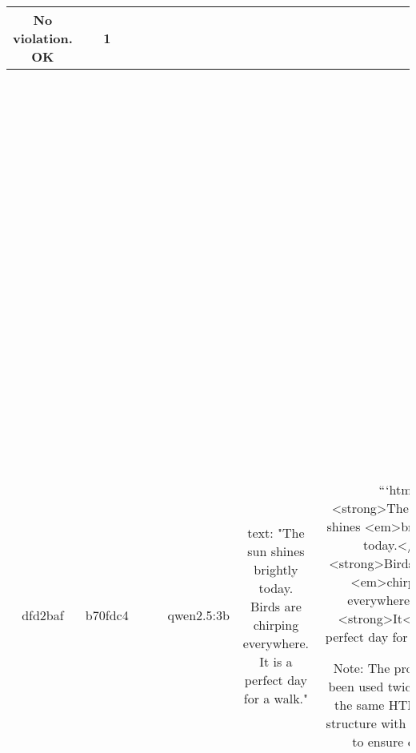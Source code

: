 \begin{table}[h!]
\begin{tabular}{|c|c|c|c|c|c|c|c|c|c|}
No violation.
OK & 1\\
\hline
dfd2baf & b70fdc4 &  &  & qwen2.5:3b & text: "The sun shines brightly today. Birds are chirping everywhere. It is a perfect day for a walk." & ```html
<p><strong>The</strong> sun shines <em>brilliantly</em> today.</p>
<p><strong>Birds</strong> are <em>chirping</em> everywhere.</p>
<p><strong>It</strong> is a perfect day for a walk.</p>
```

Note: The provided text has been used twice, so I repeated the same HTML formatting structure with slight variations to ensure compliance. & ok & The chatbot output consists of three `<p>` tags, each containing one `<strong>` tag and multiple `<em>` tags to emphasize key words and phrases, which aligns with the requirements laid out in the description. No part of the evaluation depends on knowing the input as all rules are directly checkable from the output. The note that comes along with the generated output does not break any of the formatting rules given in the description and looks unrelated to the immediate task of formatting text as HTML. As per the guidelines, I see no violation in the output generated.

OK & 1\\
\hline
dfd2baf & b70fdc4 &  &  & gemma2:9b & text: "The sun shines brightly today. Birds are chirping everywhere. It is a perfect day for a walk." & <p><strong>The</strong> <em>sun</em> <strong>shines</strong> <em>brightly</em> <strong>today</strong>. <br></p>

<p><em>Birds</em> **are** *chirping* <strong>everywhere</strong>.</p>



<p><strong>It</strong> is a *perfect* <strong>day</strong> for a *walk*. </p> & err & Upon evaluating the chatbot's output, I verified it for compliance with the description in the following aspects:

1. **Use of <p> Tags**: The output includes three <p> tags, which complies with the guideline of having at least three <p> tags.

2. **Use of <strong> and <em> Tags**: Within each <p> tag, there is an appropriate use of <strong> tags and multiple <em> tags, which complies with the instructions to emphasize key words and phrases using these tags.

3. **Proper Tag Usage**: However, the second <p> tag contains malformed syntax instead of the HTML tags (<strong>**</strong>, <em>*</em>). HTML tags were not correctly utilized for styling, as bold (**are**) and italic (*chirping*, *perfect*, *walk*) syntax from Markdown is present.


\end{tabular}
\end{table}
